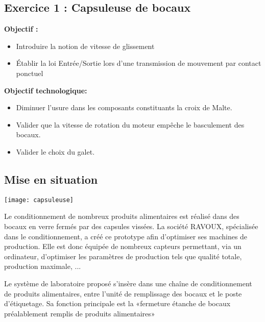 

\subsection*{Exercice 1 : Capsuleuse de bocaux}
\textbf{Objectif :} 
\begin{itemize}
\item Introduire la notion de vitesse de glissement
\item Établir la loi Entrée/Sortie lors d'une transmission de mouvement par contact ponctuel
\end{itemize}

\textbf{Objectif technologique:} 
\begin{itemize}
\item Diminuer l'usure dans les composants constituants la croix de Malte.
\item Valider que la vitesse de rotation du moteur empêche le basculement des bocaux.
\item Valider le choix du galet.
\end{itemize}

\vspace{1cm}
\subsection*{Mise en situation}

\begin{minipage}[c]{.4\linewidth}
\begin{center}
 \texttt{[image: capsuleuse]}
\end{center}

\end{minipage} \hfill
\begin{minipage}[c]{.55\linewidth}
Le conditionnement de nombreux produits alimentaires est réalisé dans des bocaux en verre fermés par des capsules vissées. La société RAVOUX, spécialisée dans le conditionnement, a créé ce prototype afin d'optimiser ses machines de production. Elle est donc équipée de nombreux capteurs permettant, via un ordinateur, d'optimiser les paramètres de production tels que qualité totale, production maximale, ...

Le système de laboratoire proposé s'insère dans une chaîne de conditionnement de produits alimentaires, entre l'unité de remplissage des bocaux et le poste d'étiquetage. Sa fonction principale est la «fermeture étanche de bocaux préalablement remplis de produits alimentaires»
\end{minipage}

